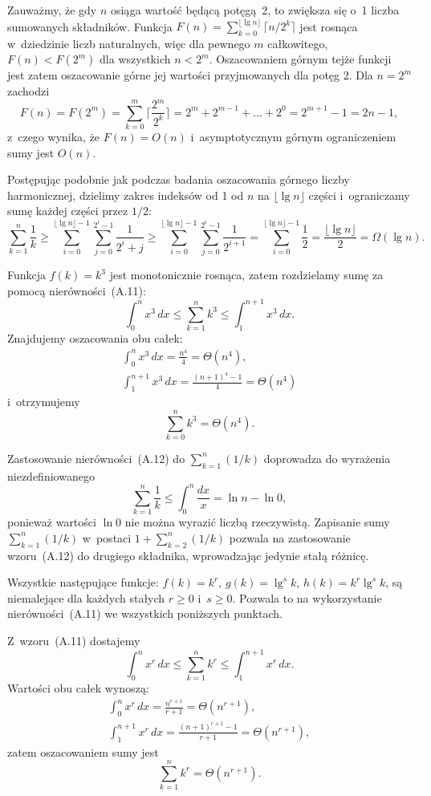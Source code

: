 \exercise %
Zauważmy, że gdy $n$ osiąga wartość będącą potęgą~2, to zwiększa się o~1 liczba sumowanych składników. Funkcja $F(n)=\sum_{k=0}^{\lfloor\lg n\rfloor}\bigl\lceil n/2^k\bigr\rceil$ jest rosnąca w~dziedzinie liczb naturalnych, więc dla pewnego $m$ całkowitego, $F(n)<F(2^m)$ dla wszystkich $n<2^m$. Oszacowaniem górnym tejże funkcji jest zatem oszacowanie górne jej wartości przyjmowanych dla potęg 2. Dla $n=2^m$ zachodzi
\[
	F(n) = F(2^m) = \sum_{k=0}^m\biggl\lceil\frac{2^m}{2^k}\biggr\rceil = 2^m+2^{m-1}+\dots+2^0 = 2^{m+1}-1 = 2n-1,
\]
z~czego wynika, że $F(n)=O(n)$ i~asymptotycznym górnym ograniczeniem sumy jest $O(n)$.

\exercise %
Postępując podobnie jak podczas badania oszacowania górnego  liczby harmonicznej, dzielimy zakres indeksów od 1 od $n$ na $\lfloor\lg n\rfloor$ części i~ograniczamy sumę każdej części przez $1/2$:
\[
    \sum_{k=1}^n\frac{1}{k} \ge \sum_{i=0}^{\lfloor\lg n\rfloor-1}\sum_{j=0}^{2^i-1}\frac{1}{2^i+j} \ge \sum_{i=0}^{\lfloor\lg n\rfloor-1}\sum_{j=0}^{2^i-1}\frac{1}{2^{i+1}} = \sum_{i=0}^{\lfloor\lg n\rfloor-1}\frac{1}{2} = \frac{\lfloor\lg n\rfloor}{2} = \Omega(\lg n).
\]

\exercise %
Funkcja $f(k)=k^3$ jest monotonicznie rosnąca, zatem rozdzielamy sumę za pomocą nierówności~(A.11):
\[
	\int_0^nx^3\,dx \le \sum_{k=1}^nk^3 \le \int_1^{n+1}x^3\,dx.
\]
Znajdujemy oszacowania obu całek:
\begin{gather*}
	\int_0^nx^3\,dx = \frac{n^4}{4} = \Theta(n^4), \\[2mm]
	\int_1^{n+1}x^3\,dx = \frac{(n+1)^4-1}{4} = \Theta(n^4)
\end{gather*}
i~otrzymujemy
\[
	\sum_{k=0}^nk^3 = \Theta(n^4).
\]

\exercise %
Zastosowanie nierówności~(A.12) do $\sum_{k=1}^n(1/k)$ doprowadza do wyrażenia niezdefiniowanego
\[
	\sum_{k=1}^n\frac{1}{k} \le \int_0^n\frac{dx}{x} = \ln n-\ln0,
\]
ponieważ wartości $\ln0$ nie można wyrazić liczbą rzeczywistą. Zapisanie sumy $\sum_{k=1}^n(1/k)$ w~postaci $1+\sum_{k=2}^n(1/k)$ pozwala na zastosowanie wzoru~(A.12) do drugiego składnika, wprowadzając jedynie stałą różnicę.

\problems

Wszystkie następujące funkcje: $f(k)=k^r$, $g(k)=\lg^sk$, $h(k)=k^r\lg^sk$, są niemalejące dla każdych stałych $r\ge0$ i~$s\ge0$. Pozwala to na wykorzystanie nierówności~(A.11) we wszystkich poniższych punktach.

\subproblem %
Z~wzoru~(A.11) dostajemy
\[
	\int_0^nx^r\,dx \le \sum_{k=1}^nk^r \le \int_1^{n+1}x^r\,dx.
\]
Wartości obu całek wynoszą:
\begin{gather*}
	\int_0^nx^r\,dx = \frac{n^{r+1}}{r+1} = \Theta(n^{r+1}), \\[2mm]
	\int_1^{n+1}x^r\,dx = \frac{(n+1)^{r+1}-1}{r+1} = \Theta(n^{r+1}),
\end{gather*}
zatem oszacowaniem sumy jest
\[
	\sum_{k=1}^nk^r = \Theta(n^{r+1}).
\]

